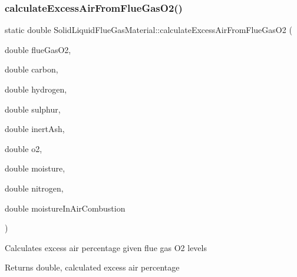 \subsubsection{\texorpdfstring{calculate\+Excess\+Air\+From\+Flue\+Gas\+O2()}{calculateExcessAirFromFlueGasO2()}\hspace{0.1cm}{\footnotesize\ttfamily [2/3]}}
{\footnotesize\ttfamily static double Solid\+Liquid\+Flue\+Gas\+Material\+::calculate\+Excess\+Air\+From\+Flue\+Gas\+O2 (\begin{DoxyParamCaption}\item[{double}]{flue\+Gas\+O2,  }\item[{double}]{carbon,  }\item[{double}]{hydrogen,  }\item[{double}]{sulphur,  }\item[{double}]{inert\+Ash,  }\item[{double}]{o2,  }\item[{double}]{moisture,  }\item[{double}]{nitrogen,  }\item[{double}]{moisture\+In\+Air\+Combustion }\end{DoxyParamCaption})\hspace{0.3cm}{\ttfamily [static]}}

Calculates excess air percentage given flue gas O2 levels \begin{DoxyReturn}{Returns}
double, calculated excess air percentage 
\end{DoxyReturn}
\mbox{\label{class_solid_liquid_flue_gas_material_abecacec1d6f108a8cdf002a9f67972c7}} 
